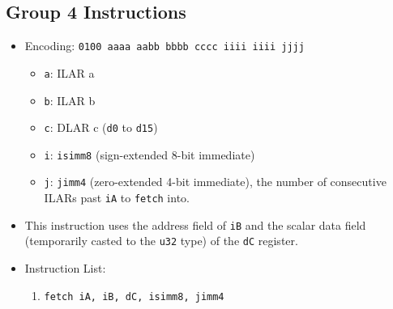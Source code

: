 \documentclass{article}
\begin{document}
	\subsection{Group 4 Instructions}
		\begin{itemize}
		\item Encoding:  \texttt{0100 aaaa aabb bbbb  cccc iiii iiii jjjj}
			\begin{itemize}
			\item \texttt{a}:  ILAR a
			\item \texttt{b}:  ILAR b
			\item \texttt{c}:  DLAR c (\texttt{d0} to \texttt{d15})
			\item \texttt{i}:  \texttt{isimm8} (sign-extended 8-bit
			immediate)
			\item \texttt{j}:  \texttt{jimm4} (zero-extended 4-bit
			immediate), the number of consecutive ILARs past \texttt{iA} to
			\texttt{fetch} into.
			\end{itemize}

		\item This instruction uses the address field of \texttt{iB} and
		the scalar data field (temporarily casted to the \texttt{u32} type)
		of the \texttt{dC} register.

		\item Instruction List:
			\begin{enumerate}
			\item \texttt{fetch iA, iB, dC, isimm8, jimm4}
			\end{enumerate}
		\end{itemize}
		\newpage
\end{document}
